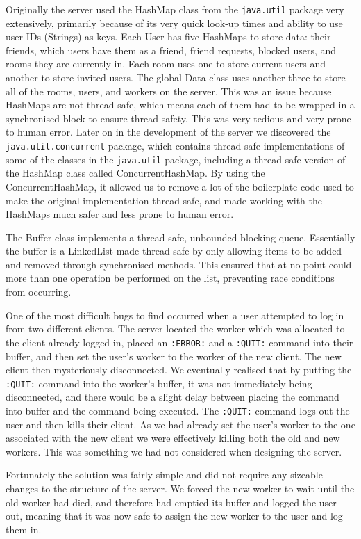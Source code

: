 Originally the server used the HashMap class from the \texttt{java.util} package very extensively, primarily because of its very quick look-up times and ability to use user IDs (Strings) as keys. Each User has five HashMaps to store data: their friends, which users have them as a friend, friend requests, blocked users, and rooms they are currently in. Each room uses one to store current users and another to store invited users. The global Data class uses another three to store all of the rooms, users, and workers on the server. This was an issue because HashMaps are not thread-safe, which means each of them had to be wrapped in a synchronised block to ensure thread safety. This was very tedious and very prone to human error. Later on in the development of the server we discovered the \texttt{java.util.concurrent} package, which contains thread-safe implementations of some of the classes in the \texttt{java.util} package, including a thread-safe version of the HashMap class called ConcurrentHashMap. By using the ConcurrentHashMap, it allowed us to remove a lot of the boilerplate code used to make the original implementation thread-safe, and made working with the HashMaps much safer and less prone to human error.

The Buffer class implements a thread-safe, unbounded blocking queue. Essentially the buffer is a LinkedList made thread-safe by only allowing items to be added and removed through synchronised methods. This ensured that at no point could more than one operation be performed on the list, preventing race conditions from occurring.

One of the most difficult bugs to find occurred when a user attempted to log in from two different clients. The server located the worker which was allocated to the client already logged in, placed an \texttt{:ERROR:} and a \texttt{:QUIT:} command into their buffer, and then set the user's worker to the worker of the new client. The new client then mysteriously disconnected. We eventually realised that by putting the \texttt{:QUIT:} command into the worker's buffer, it was not immediately being disconnected, and there would be a slight delay between placing the command into buffer and the command being executed. The \texttt{:QUIT:} command logs out the user and then kills their client. As we had already set the user's worker to the one associated with the new client we were effectively killing both the old and new workers. This was something we had not considered when designing the server. 

Fortunately the solution was fairly simple and did not require any sizeable changes to the structure of the server. We forced the new worker to wait until the old worker had died, and therefore had emptied its buffer and logged the user out, meaning that it was now safe to assign the new worker to the user and log them in.

